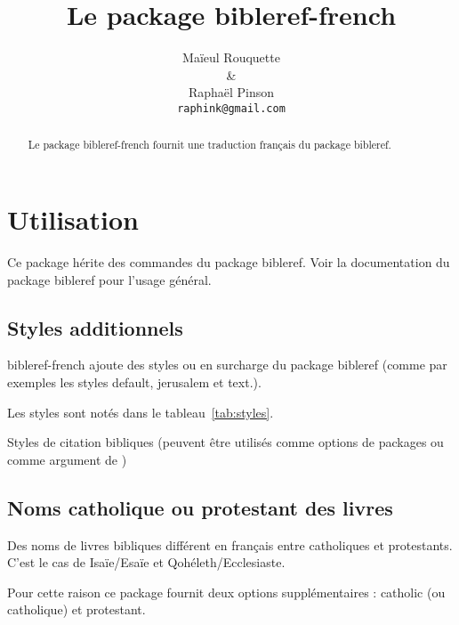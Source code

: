 \documentclass{ltxdoc}
\begin{document}
\shorthandoff{:}
\title{Le package \textsf{bibleref-french}}
\author{Ma\"ieul Rouquette \\ \& \\ Rapha\"el Pinson \\ \texttt{raphink@gmail.com}}

\maketitle
\begin{abstract}
Le  package \textsf{bibleref-french} fournit une traduction français du package \textsf{bibleref}.
\end{abstract}

\section{Utilisation}

Ce package hérite des commandes du package \textsf{bibleref}. Voir la documentation du package \textsf{bibleref} pour l'usage général.

\subsection{Styles additionnels}

\textsf{bibleref-french} ajoute des styles ou en surcharge du package \textsf{bibleref} (comme par exemples les styles \textsf{default}, \textsf{jerusalem} et \textsf{text}.).

Les styles sont notés dans le tableau~\ref{tab:styles}.

\begin{table}[tbh]
\caption{Styles de citation bibliques  (peuvent être utilisés comme options de  packages ou comme argument de  )}
\label{tab:styles}
\vspace{10pt}
\begin{center}

\end{center}
\end{table}

\subsection{Noms catholique ou protestant des livres}

Des noms de livres bibliques différent en français entre catholiques et protestants. C'est le cas de Isaïe/Esaïe et 
Qohéleth/Ecclesiaste.

Pour cette raison ce package fournit deux options supplémentaires :  \textsf{catholic} (ou \textsf{catholique}) et \textsf{protestant}. 
\end{document}
